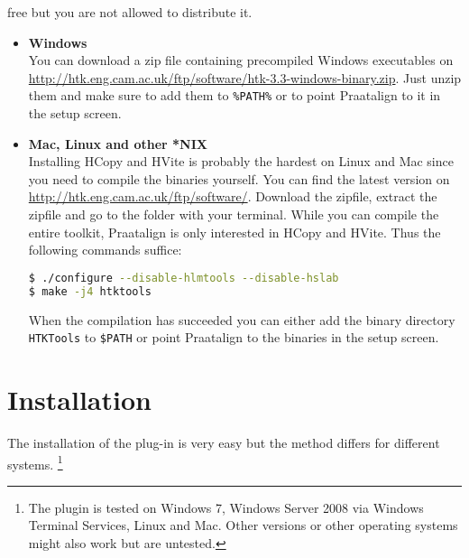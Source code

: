 \begin{itemize}
		free but you are not allowed to distribute it.
		\begin{itemize}
			\item \textbf{Windows}\\
				You can download a zip file containing precompiled Windows executables
				on \url{http://htk.eng.cam.ac.uk/ftp/software/htk-3.3-windows-binary.zip}.
				Just unzip them and make sure to add them to \texttt{\%PATH\%} or to
				point Praatalign to it in the setup screen.
			\item \textbf{Mac, Linux and other *NIX}\\
				Installing HCopy and HVite is probably the hardest on Linux and Mac
				since you need to compile the binaries yourself. You can find the
				latest version on \url{http://htk.eng.cam.ac.uk/ftp/software/}.
				Download the zipfile, extract the zipfile and go to the folder with
				your terminal. While you can compile the entire toolkit, Praatalign is
				only interested in HCopy and HVite. Thus the following commands
				suffice:
				\begin{lstlisting}[language=bash]
$ ./configure --disable-hlmtools --disable-hslab
$ make -j4 htktools
				\end{lstlisting}
				When the compilation has succeeded you can either add the binary
				directory \texttt{HTKTools} to \texttt{\$PATH} or point Praatalign to
				the binaries in the setup screen.
		\end{itemize}
\end{itemize}

\section{Installation}
\label{sec:installation}
The installation of the plug-in is very easy but the method differs for
different systems. \footnote{The plugin is tested on Windows 7, Windows Server
2008 via Windows Terminal Services, Linux and Mac. Other versions or other
operating systems might also work but are untested.}
